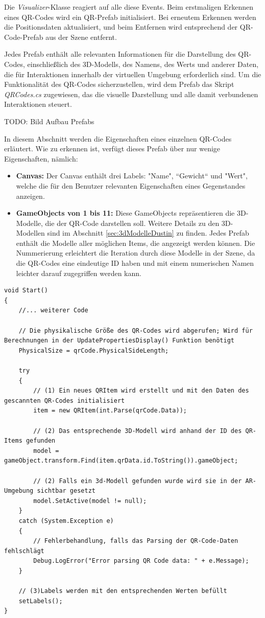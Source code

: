 Die \textit{Visualizer}-Klasse reagiert auf alle diese Events. Beim erstmaligen Erkennen eines QR-Codes wird ein QR-Prefab initialisiert. Bei erneutem Erkennen werden die Positionsdaten aktualisiert, und beim Entfernen wird entsprechend der QR-Code-Prefab aus der Szene entfernt.

Jedes Prefab enthält alle relevanten Informationen für die Darstellung des QR-Codes, einschließlich des 3D-Modells, des Namens, des Werts und anderer Daten, die für Interaktionen innerhalb der virtuellen Umgebung erforderlich sind. Um die Funktionalität des QR-Codes sicherzustellen, wird dem Prefab das Skript \textit{QRCodes.cs} zugewiesen, das die visuelle Darstellung und alle damit verbundenen Interaktionen steuert.

TODO: Bild Aufbau Prefabs

In diesem Abschnitt werden die Eigenschaften eines einzelnen QR-Codes erläutert. Wie zu erkennen ist, verfügt dieses Prefab über nur wenige Eigenschaften, nämlich:
\begin{itemize}
\item \textbf{Canvas:} Der Canvas enthält drei Labels: "Name", ``Gewicht`` und "Wert", welche die für den Benutzer relevanten Eigenschaften eines Gegenstandes anzeigen.
\item \textbf{GameObjects von 1 bis 11:} Diese GameObjects repräsentieren die 3D-Modelle, die der QR-Code darstellen soll. Weitere Details zu den 3D-Modellen sind im Abschnitt \ref{sec:3dModelleDustin} zu finden. Jedes Prefab enthält die Modelle aller möglichen Items, die angezeigt werden können. Die Nummerierung erleichtert die Iteration durch diese Modelle in der Szene, da die QR-Codes eine eindeutige ID haben und mit einem numerischen Namen leichter darauf zugegriffen werden kann.
\end{itemize}

\begin{lstlisting}[style=csharp, caption={Instanzierung eines QR-Prefabs}, label=code:QR-Prefab instanzierung]
void Start()
{
    //... weiterer Code

    // Die physikalische Größe des QR-Codes wird abgerufen; Wird für Berechnungen in der UpdatePropertiesDisplay() Funktion benötigt
    PhysicalSize = qrCode.PhysicalSideLength;

    try
    {
        // (1) Ein neues QRItem wird erstellt und mit den Daten des gescannten QR-Codes initialisiert
        item = new QRItem(int.Parse(qrCode.Data));

        // (2) Das entsprechende 3D-Modell wird anhand der ID des QR-Items gefunden
        model = gameObject.transform.Find(item.qrData.id.ToString()).gameObject;

        // (2) Falls ein 3d-Modell gefunden wurde wird sie in der AR-Umgebung sichtbar gesetzt
        model.SetActive(model != null);
    }
    catch (System.Exception e)
    {
        // Fehlerbehandlung, falls das Parsing der QR-Code-Daten fehlschlägt
        Debug.LogError("Error parsing QR Code data: " + e.Message);
    }

    // (3)Labels werden mit den entsprechenden Werten befüllt
    setLabels();
}
\end{lstlisting}

